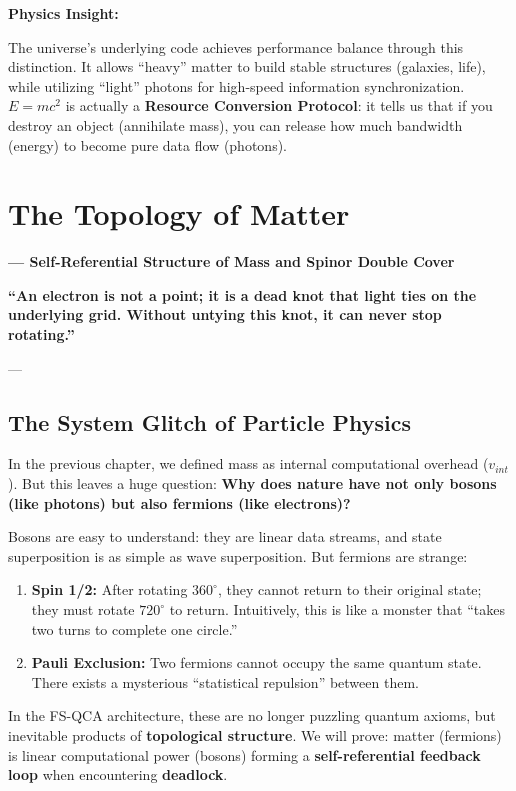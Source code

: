\documentclass[11pt,a4paper,twoside]{book}
\begin{document}
\textbf{Physics Insight:}

The universe's underlying code achieves performance balance through this distinction. It allows ``heavy'' matter to build stable structures (galaxies, life), while utilizing ``light'' photons for high-speed information synchronization. \textbf{$E=mc^2$} is actually a \textbf{Resource Conversion Protocol}: it tells us that if you destroy an object (annihilate mass), you can release how much bandwidth (energy) to become pure data flow (photons).

 \section{The Topology of Matter}

\textbf{--- Self-Referential Structure of Mass and Spinor Double Cover}

\textbf{``An electron is not a point; it is a dead knot that light ties on the underlying grid. Without untying this knot, it can never stop rotating.''}

---

\subsection{The System Glitch of Particle Physics}

In the previous chapter, we defined mass as internal computational overhead (\textbf{$v_{int}$}). But this leaves a huge question: \textbf{Why does nature have not only bosons (like photons) but also fermions (like electrons)?}

Bosons are easy to understand: they are linear data streams, and state superposition is as simple as wave superposition. But fermions are strange:

\begin{enumerate}
\item \textbf{Spin 1/2:} After rotating \textbf{$360^\circ$}, they cannot return to their original state; they must rotate \textbf{$720^\circ$} to return. Intuitively, this is like a monster that ``takes two turns to complete one circle.''

\item \textbf{Pauli Exclusion:} Two fermions cannot occupy the same quantum state. There exists a mysterious ``statistical repulsion'' between them.
\end{enumerate}

In the FS-QCA architecture, these are no longer puzzling quantum axioms, but inevitable products of \textbf{topological structure}. We will prove: matter (fermions) is linear computational power (bosons) forming a \textbf{self-referential feedback loop} when encountering \textbf{deadlock}.
\end{document}
